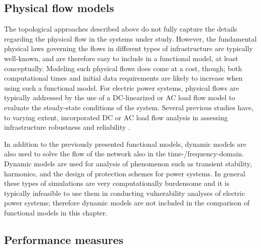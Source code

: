 
\subsection{Physical flow models}
\label{sec:ch3:models:physflow}

The topological approaches described above do not fully capture the details regarding the physical flow in the systems under study. However, the fundamental physical laws governing the flows in different types of infrastructure are typically well-known, and are therefore easy to include in a functional model, at least conceptually.  Modeling such physical flows does come at a cost, though; both computational times and initial data requirements are likely to increase when using such a functional model. For electric power systems, physical flows are typically addressed by the use of a DC-linearized or AC load flow model to evaluate the steady-state conditions of the system. Several previous studies have, to varying extent, incorporated DC or AC load flow analysis in assessing infrastructure robustness and reliability \cite{Dobson2001, Carreras2002a, Dobson2002, Dobson2003, Song2005, Pepyne2007, Arianos2009, Chen2010}.

In addition to the previously presented functional models, dynamic models are also used to solve the flow of the network also in the time-/frequency-domain. Dynamic models are used for analysis of phenomenon such as transient stability, harmonics, and the design of protection schemes for power systems. In general these types of simulations are very computationally burdensome and it is typically infeasible to use them in conducting vulnerability analyses of electric power systems; therefore dynamic models are not included in the comparison of functional models in this chapter.
 

\subsection{Performance measures}
\label{ssec:models:performance}

